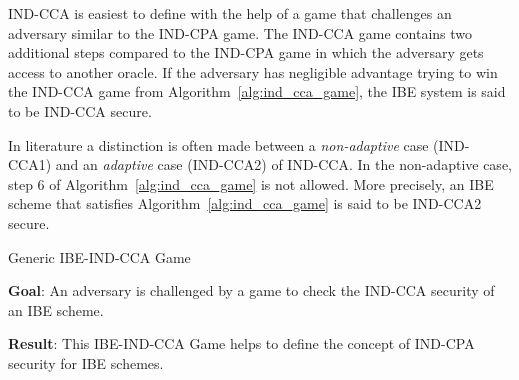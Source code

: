 IND-CCA is easiest to define with the help of a game that challenges an adversary similar to the IND-CPA game. The IND-CCA game contains two additional steps compared to the IND-CPA game in which the adversary gets access to another oracle. If the adversary has negligible advantage trying to win the IND-CCA game from Algorithm~\ref{alg:ind_cca_game}, the IBE system is said to be IND-CCA secure.

In literature a distinction is often made between a \textit{non-adaptive} case (IND-CCA1) and an \textit{adaptive} case (IND-CCA2) of IND-CCA. In the non-adaptive case, step 6 of Algorithm~\ref{alg:ind_cca_game} is not allowed. More precisely, an IBE scheme that satisfies Algorithm~\ref{alg:ind_cca_game} is said to be IND-CCA2 secure.

\begin{algorithm}
\caption{Generic IBE-IND-CCA Game~\cite{thesis:Alfredo08}}
\label{alg:ind_cca_game}
 \textbf{Goal}: An adversary is challenged by a game to check the IND-CCA security of an IBE scheme.
 
 \textbf{Result}: This IBE-IND-CCA Game helps to define the concept of IND-CPA security for IBE schemes.


\end{algorithm}
